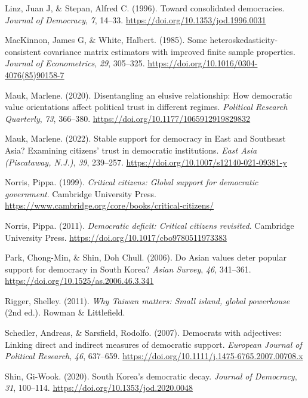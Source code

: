 \documentclass[
  12pt,
  12pt,
  letterpaper]{article}
\newlength{\cslhangindent}
\newenvironment{CSLReferences}[2] %
 {\begin{list}{}{%
  \setlength{\itemindent}{0pt}
  \setlength{\leftmargin}{0pt}
  \setlength{\parsep}{0pt}
  \ifodd #1
   \setlength{\leftmargin}{\cslhangindent}
   \setlength{\itemindent}{-1\cslhangindent}
  \fi
  \setlength{\itemsep}{#2\baselineskip}}}
 {\end{list}}
\begin{document}
\begin{CSLReferences}{1}{0}
Linz, Juan J, \& Stepan, Alfred C. (1996). {Toward consolidated
democracies}. \emph{Journal of Democracy}, \emph{7}, 14--33.
\url{https://doi.org/10.1353/jod.1996.0031}

MacKinnon, James G, \& White, Halbert. (1985). {Some
heteroskedasticity-consistent covariance matrix estimators with improved
finite sample properties}. \emph{Journal of Econometrics}, \emph{29},
305--325. \url{https://doi.org/10.1016/0304-4076(85)90158-7}

Mauk, Marlene. (2020). {Disentangling an elusive relationship: How
democratic value orientations affect political trust in different
regimes}. \emph{Political Research Quarterly}, \emph{73}, 366--380.
\url{https://doi.org/10.1177/1065912919829832}

Mauk, Marlene. (2022). {Stable support for democracy in East and
Southeast Asia? Examining citizens' trust in democratic institutions}.
\emph{East Asia (Piscataway, N.J.)}, \emph{39}, 239--257.
\url{https://doi.org/10.1007/s12140-021-09381-y}

Norris, Pippa. (1999). \emph{{Critical citizens: Global support for
democratic government}}. Cambridge University Press.
\url{https://www.cambridge.org/core/books/critical-citizens/}

Norris, Pippa. (2011). \emph{{Democratic deficit: Critical citizens
revisited}}. Cambridge University Press.
\url{https://doi.org/10.1017/cbo9780511973383}

Park, Chong-Min, \& Shin, Doh Chull. (2006). {Do Asian values deter
popular support for democracy in South Korea?} \emph{Asian Survey},
\emph{46}, 341--361. \url{https://doi.org/10.1525/as.2006.46.3.341}

Rigger, Shelley. (2011). \emph{{Why Taiwan matters: Small island, global
powerhouse}} (2nd ed.). Rowman \& Littlefield.

Schedler, Andreas, \& Sarsfield, Rodolfo. (2007). {Democrats with
adjectives: Linking direct and indirect measures of democratic support}.
\emph{European Journal of Political Research}, \emph{46}, 637--659.
\url{https://doi.org/10.1111/j.1475-6765.2007.00708.x}

Shin, Gi-Wook. (2020). {South Korea's democratic decay}. \emph{Journal
of Democracy}, \emph{31}, 100--114.
\url{https://doi.org/10.1353/jod.2020.0048}


\end{CSLReferences}
\end{document}
